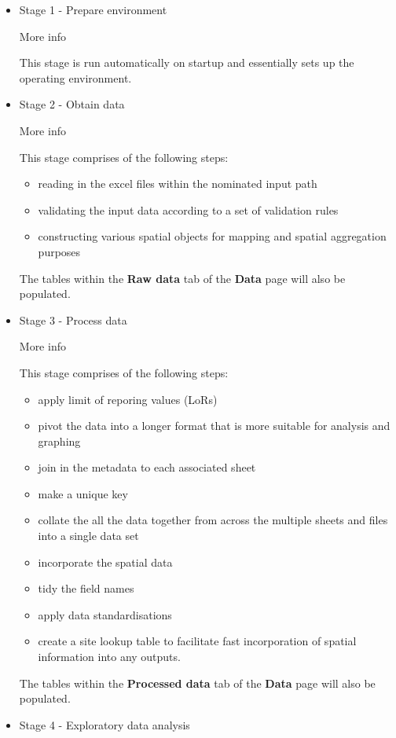 \documentclass[
  8pt,
  a4paper]{article}
\providecommand{\tightlist}{%
  \setlength{\itemsep}{0pt}\setlength{\parskip}{0pt}}
\begin{document}
\begin{itemize}
\item
  Stage 1 - Prepare environment

  More info

  This stage is run automatically on startup and essentially sets up the
  operating environment.
\item
  Stage 2 - Obtain data

  More info

  This stage comprises of the following steps:

  \begin{itemize}
  \tightlist
  \item
    reading in the excel files within the nominated input path
  \item
    validating the input data according to a set of validation rules
  \item
    constructing various spatial objects for mapping and spatial
    aggregation purposes
  \end{itemize}

  The tables within the \textbf{Raw data} tab of the \textbf{Data} page
  will also be populated.
\item
  Stage 3 - Process data

  More info

  This stage comprises of the following steps:

  \begin{itemize}
  \tightlist
  \item
    apply limit of reporing values (LoRs)
  \item
    pivot the data into a longer format that is more suitable for
    analysis and graphing
  \item
    join in the metadata to each associated sheet
  \item
    make a unique key
  \item
    collate the all the data together from across the multiple sheets
    and files into a single data set
  \item
    incorporate the spatial data
  \item
    tidy the field names
  \item
    apply data standardisations
  \item
    create a site lookup table to facilitate fast incorporation of
    spatial information into any outputs.
  \end{itemize}

  The tables within the \textbf{Processed data} tab of the \textbf{Data}
  page will also be populated.
\item
  Stage 4 - Exploratory data analysis


\end{itemize}
\end{document}
